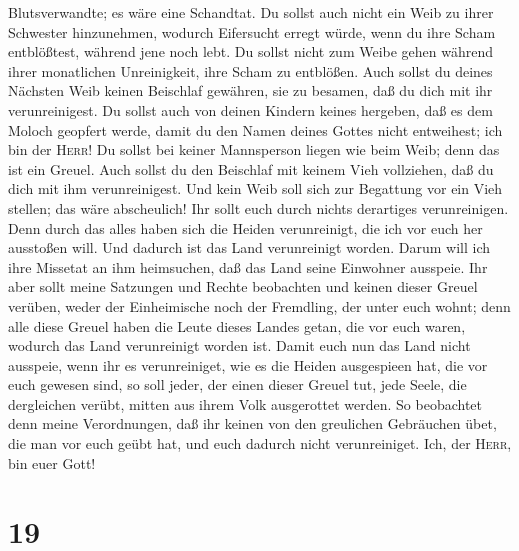 Blutsverwandte; es wäre eine Schandtat.  Du sollst auch
nicht ein Weib zu ihrer Schwester hinzunehmen, wodurch Eifersucht erregt
würde, wenn du ihre Scham entblößtest, während jene noch lebt.
 Du sollst nicht zum Weibe gehen während ihrer
monatlichen Unreinigkeit, ihre Scham zu entblößen.  Auch
sollst du deines Nächsten Weib keinen Beischlaf gewähren, sie zu
besamen, daß du dich mit ihr verunreinigest.  Du sollst
auch von deinen Kindern keines hergeben, daß es dem Moloch geopfert
werde, damit du den Namen deines Gottes nicht entweihest; ich bin der
\textsc{Herr}!  Du sollst bei keiner Mannsperson liegen
wie beim Weib; denn das ist ein Greuel.  Auch sollst du
den Beischlaf mit keinem Vieh vollziehen, daß du dich mit ihm
verunreinigest. Und kein Weib soll sich zur Begattung vor ein Vieh
stellen; das wäre abscheulich!  Ihr sollt euch durch
nichts derartiges verunreinigen. Denn durch das alles haben sich die
Heiden verunreinigt, die ich vor euch her ausstoßen will.
 Und dadurch ist das Land verunreinigt worden. Darum will
ich ihre Missetat an ihm heimsuchen, daß das Land seine Einwohner
ausspeie.  Ihr aber sollt meine Satzungen und Rechte
beobachten und keinen dieser Greuel verüben, weder der Einheimische noch
der Fremdling, der unter euch wohnt;  denn alle diese
Greuel haben die Leute dieses Landes getan, die vor euch waren, wodurch
das Land verunreinigt worden ist.  Damit euch nun das
Land nicht ausspeie, wenn ihr es verunreiniget, wie es die Heiden
ausgespieen hat, die vor euch gewesen sind,  so soll
jeder, der einen dieser Greuel tut, jede Seele, die dergleichen verübt,
mitten aus ihrem Volk ausgerottet werden.  So beobachtet
denn meine Verordnungen, daß ihr keinen von den greulichen Gebräuchen
übet, die man vor euch geübt hat, und euch dadurch nicht verunreiniget.
Ich, der \textsc{Herr}, bin euer Gott!

\hypertarget{section-18}{%
\section{19}\label{section-18}}


